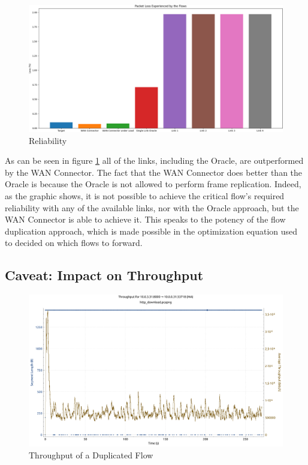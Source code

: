 \begin{figure}[h]
    \centering
        \includegraphics[height=0.66\textwidth,width=\textwidth]{fig/loss_bars1.png}
        \caption{Reliability}
        \label{fig:loss_bars1}
\end{figure}

As can be seen in figure \ref{fig:loss_bars1} all of the links, including the Oracle, are outperformed by the WAN Connector. The fact that the WAN Connector does better than the Oracle is because the Oracle is not allowed to perform frame replication. Indeed, as the graphic shows, it is not possible to achieve the critical flow's required reliability with any of the available links, nor with the Oracle approach, but the WAN Connector is able to achieve it. This speaks to the potency of the flow duplication approach, which is made possible in the optimization equation used to decided on which flows to forward.

\subsection{Caveat: Impact on Throughput}


\begin{figure}[h]
    \centering
        \includegraphics[height=0.66\textwidth,width=\textwidth]{fig/tcp_throughput.pdf}
        \caption{Throughput of a Duplicated Flow}
        \label{fig:dup_tcp}
\end{figure}

